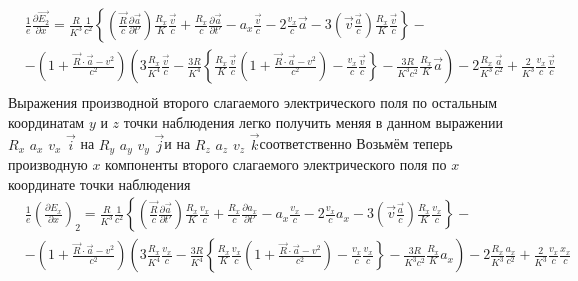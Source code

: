 \documentclass[11pt]{article}
\begin{document}
\[\begin{align}
  & \frac{1}{e}\frac{\partial \overrightarrow{{{E}_{2}}}}{\partial x}=\frac{R}{{{K}^{3}}}\frac{1}{{{c}^{2}}}\left\{ \left( \frac{\overrightarrow{R}}{c}\frac{\partial \overrightarrow{a}}{\partial t'} \right)\frac{{{R}_{x}}}{K}\frac{\overrightarrow{v}}{c}+\frac{{{R}_{x}}}{c}\frac{\partial \overrightarrow{a}}{\partial t'}-{{a}_{x}}\frac{\overrightarrow{v}}{c}-2\frac{{{v}_{x}}}{c}\overrightarrow{a}-3\left( \overrightarrow{v}\frac{\overrightarrow{a}}{c} \right)\frac{{{R}_{x}}}{K}\frac{\overrightarrow{v}}{c} \right\}- \\
 & -\left( 1+\frac{\overrightarrow{R}\cdot \overrightarrow{a}-{{v}^{2}}}{{{c}^{2}}} \right)\left( 3\frac{{{R}_{x}}}{{{K}^{4}}}\frac{\overrightarrow{v}}{c}-\frac{3R}{{{K}^{4}}}\left\{ \frac{{{R}_{x}}}{K}\frac{\overrightarrow{v}}{c}\left( 1+\frac{\overrightarrow{R}\cdot \overrightarrow{a}-{{v}^{2}}}{{{c}^{2}}} \right)-\frac{{{v}_{x}}}{c}\frac{\overrightarrow{v}}{c} \right\}-\frac{3R}{{{K}^{3}}{{c}^{2}}}\frac{{{R}_{x}}}{K}\overrightarrow{a} \right)-2\frac{{{R}_{x}}}{{{K}^{3}}}\frac{\overrightarrow{a}}{{{c}^{2}}}+\frac{2}{{{K}^{3}}}\frac{{{v}_{x}}}{c}\frac{\overrightarrow{v}}{c} \\
\end{align}\] Выражения производной второго слагаемого электрического
поля по остальным координатам \(y\) и \(z\) точки наблюдения легко
получить меняя в данном выражении \({{R}_{x}}\) \({{a}_{x}}\)
\({{v}_{x}}\) \(\overrightarrow{i}\) на \({{R}_{y}}\) \({{a}_{y}}\)
\({{v}_{y}}\) \(\overrightarrow{j}\)и на \({{R}_{z}}\) \({{a}_{z}}\)
\({{v}_{z}}\) \(\overrightarrow{k}\)соответственно Возьмём теперь
производную \(x\) компоненты второго слагаемого электрического поля по
\(x\) координате точки наблюдения \[\begin{align}
  & \frac{1}{e}{{\left( \frac{\partial {{E}_{x}}}{\partial x} \right)}_{2}}=\frac{R}{{{K}^{3}}}\frac{1}{{{c}^{2}}}\left\{ \left( \frac{\overrightarrow{R}}{c}\frac{\partial \overrightarrow{a}}{\partial t'} \right)\frac{{{R}_{x}}}{K}\frac{{{v}_{x}}}{c}+\frac{{{R}_{x}}}{c}\frac{\partial {{a}_{x}}}{\partial t'}-{{a}_{x}}\frac{{{v}_{x}}}{c}-2\frac{{{v}_{x}}}{c}{{a}_{x}}-3\left( \overrightarrow{v}\frac{\overrightarrow{a}}{c} \right)\frac{{{R}_{x}}}{K}\frac{{{v}_{x}}}{c} \right\}- \\
 & -\left( 1+\frac{\overrightarrow{R}\cdot \overrightarrow{a}-{{v}^{2}}}{{{c}^{2}}} \right)\left( 3\frac{{{R}_{x}}}{{{K}^{4}}}\frac{{{v}_{x}}}{c}-\frac{3R}{{{K}^{4}}}\left\{ \frac{{{R}_{x}}}{K}\frac{{{v}_{x}}}{c}\left( 1+\frac{\overrightarrow{R}\cdot \overrightarrow{a}-{{v}^{2}}}{{{c}^{2}}} \right)-\frac{{{v}_{x}}}{c}\frac{{{v}_{x}}}{c} \right\}-\frac{3R}{{{K}^{3}}{{c}^{2}}}\frac{{{R}_{x}}}{K}{{a}_{x}} \right)-2\frac{{{R}_{x}}}{{{K}^{3}}}\frac{{{a}_{x}}}{{{c}^{2}}}+\frac{2}{{{K}^{3}}}\frac{{{v}_{x}}}{c}\frac{{{x}_{x}}}{c} \\
\end{align}\]
\end{document}
